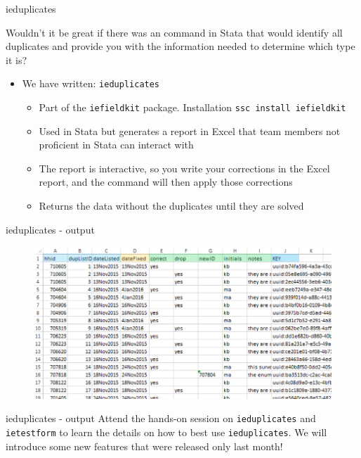 \documentclass[aspectratio=169]{beamer}
\begin{document}
\begin{frame}{ieduplicates}
	
	Wouldn't it be great if there was an command in Stata that would identify all duplicates and provide you with the information needed to determine which type it is?

	\begin{itemize}
		\item We have written: \texttt{ieduplicates}
		\begin{itemize}
			\item Part of the \texttt{iefieldkit} package. Installation \texttt{ssc install iefieldkit}
			\item Used in Stata but generates a report in Excel that team members not proficient in Stata can interact with
			\item The report is interactive, so you write your corrections in the Excel report, and the command will then apply those corrections
			\item Returns the data without the duplicates until they are solved
		\end{itemize}
	\end{itemize}
\end{frame}

\begin{frame}{ieduplicates - output}
	\begin{figure}
		\centering
		\includegraphics[width=.9\linewidth]{img/ieduplicates-output.png}
	\end{figure}
\end{frame}

\begin{frame}{ieduplicates - output}
	Attend the hands-on session on \texttt{ieduplicates} and \texttt{ietestform} to learn the details on how to best use \texttt{ieduplicates}. We will introduce some new features that were released only last month!
\end{frame}
\end{document}
